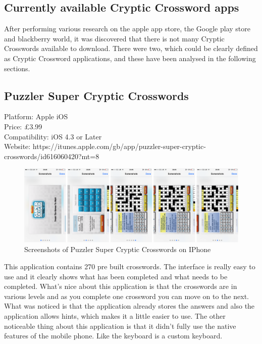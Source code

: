\begin{flushright}
    \citep{forbes13}
\end{flushright}

\subsection{Currently available Cryptic Crossword apps}

After performing various research on the apple app store, the Google play store and blackberry world, it was discovered that there is not many Cryptic Crosswords available to download. There were two, which could be clearly defined as Cryptic Crossword applications, and these have been analysed in the following sections.

\subsection{Puzzler Super Cryptic Crosswords}

Platform: Apple iOS \\
Price: \pounds3.99 \\
Compatibility: iOS 4.3 or Later \\
Website: https://itunes.apple.com/gb/app/puzzler-super-cryptic-crosswords/id616060420?mt=8

\begin{figure}[!ht]
    \includegraphics[width=\linewidth]{research/mobile_platforms/pscs.png}
    \caption{Screenshots of Puzzler Super Cryptic Crosswords on IPhone}
\end{figure}

This application contains 270 pre built crosswords. The interface is really easy to use and it clearly shows what has been completed and what needs to be completed. What’s nice about this application is that the crosswords are in various levels and as you complete one crossword you can move on to the next. What was noticed is that the application already stores the answers and also the application allows hints, which makes it a little easier to use. The other noticeable thing about this application is that it didn’t fully use the native features of the mobile phone. Like the keyboard is a custom keyboard. 


